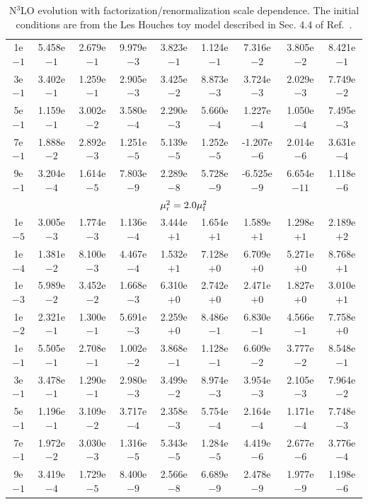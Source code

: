 \begin{table}[htp]
{\begin{tabular}{ccccccccc}
1e$-1$ &  5.458e$-1$ &  2.679e$-1$ &  9.979e$-3$ &  3.823e$-1$ &  1.124e$-1$ &  7.316e$-2$ &  3.805e$-2$ &  8.421e$-1$ \\
3e$-1$ &  3.402e$-1$ &  1.259e$-1$ &  2.905e$-3$ &  3.425e$-2$ &  8.873e$-3$ &  3.724e$-3$ &  2.029e$-3$ &  7.749e$-2$ \\
5e$-1$ &  1.159e$-1$ &  3.002e$-2$ &  3.580e$-4$ &  2.290e$-3$ &  5.660e$-4$ &  1.227e$-4$ &  1.050e$-4$ &  7.495e$-3$ \\
7e$-1$ &  1.888e$-2$ &  2.892e$-3$ &  1.251e$-5$ &  5.139e$-5$ &  1.252e$-5$ & -1.207e$-6$ &  2.014e$-6$ &  3.631e$-4$ \\
9e$-1$ &  3.204e$-4$ &  1.614e$-5$ &  7.803e$-9$ &  2.289e$-8$ &  5.728e$-9$ & -6.525e$-9$ &  6.654e$-11$ &  1.118e$-6$ \\
\midrule
\multicolumn{9}{c}{$\mu_{\rm r}^2 = 2.0\mu_{\rm f}^2$} \\
\midrule
1e$-5$ &  3.005e$-3$ &  1.774e$-3$ &  1.136e$-4$ &  3.444e$+1$ &  1.654e$+1$ &  1.589e$+1$ &  1.298e$+1$ &  2.189e$+2$ \\
1e$-4$ &  1.381e$-2$ &  8.100e$-3$ &  4.467e$-4$ &  1.532e$+1$ &  7.128e$+0$ &  6.709e$+0$ &  5.271e$+0$ &  8.768e$+1$ \\
1e$-3$ &  5.989e$-2$ &  3.452e$-2$ &  1.668e$-3$ &  6.310e$+0$ &  2.742e$+0$ &  2.471e$+0$ &  1.827e$+0$ &  3.010e$+1$ \\
1e$-2$ &  2.321e$-1$ &  1.300e$-1$ &  5.691e$-3$ &  2.259e$+0$ &  8.486e$-1$ &  6.830e$-1$ &  4.566e$-1$ &  7.758e$+0$ \\
1e$-1$ &  5.505e$-1$ &  2.708e$-1$ &  1.002e$-2$ &  3.868e$-1$ &  1.128e$-1$ &  6.609e$-2$ &  3.777e$-2$ &  8.548e$-1$ \\
3e$-1$ &  3.478e$-1$ &  1.290e$-1$ &  2.980e$-3$ &  3.499e$-2$ &  8.974e$-3$ &  3.954e$-3$ &  2.105e$-3$ &  7.964e$-2$ \\
5e$-1$ &  1.196e$-1$ &  3.109e$-2$ &  3.717e$-4$ &  2.358e$-3$ &  5.754e$-4$ &  2.164e$-4$ &  1.171e$-4$ &  7.748e$-3$ \\
7e$-1$ &  1.972e$-2$ &  3.030e$-3$ &  1.316e$-5$ &  5.343e$-5$ &  1.284e$-5$ &  4.419e$-6$ &  2.677e$-6$ &  3.776e$-4$ \\
9e$-1$ &  3.419e$-4$ &  1.729e$-5$ &  8.400e$-9$ &  2.566e$-8$ &  6.689e$-9$ &  2.478e$-9$ &  1.977e$-9$ &  1.198e$-6$ \\
\bottomrule
\end{tabular}%
}
\caption{N$^3$LO evolution with factorization/renormalization scale dependence. The initial conditions are from the Les Houches toy model described in Sec. 4.4 of Ref.~\cite{Dittmar:2005ed}.}
\label{tab:scaleratioN3LO}
\end{table}


